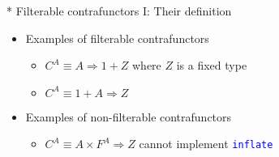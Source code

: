\documentclass[english]{beamer}
\begin{document}
\begin{frame}{{*} Filterable contrafunctors I: Their definition}
\begin{itemize}
\begin{itemize}
\item 2 laws (identity, contracomposition) for \texttt{\textcolor{blue}{\footnotesize{}contrafmapOpt}} 
\begin{itemize}
\item as before, \texttt{\textcolor{blue}{\footnotesize{}contrafmapOpt}}
is a ``twisted'' version of \texttt{\textcolor{blue}{\footnotesize{}contrafmap}} 
\end{itemize}
\end{itemize}
\item Examples of filterable contrafunctors
\begin{itemize}
\item $C^{A}\equiv A\Rightarrow1+Z$ where $Z$ is a fixed type
\item $C^{A}\equiv1+A\Rightarrow Z$
\end{itemize}
\item Examples of non-filterable contrafunctors
\begin{itemize}
\item $C^{A}\equiv A\times F^{A}\Rightarrow Z$ \textendash{} cannot implement
\texttt{\textcolor{blue}{\footnotesize{}inflate}} 
\end{itemize}
\end{itemize}
\end{frame}
\end{document}
